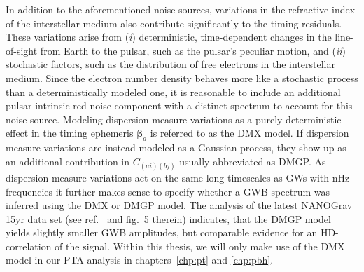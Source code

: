 In addition to the aforementioned noise sources, variations in the refractive index of the interstellar medium also contribute significantly to the timing residuals. These variations arise from (\textit{i}) deterministic, time-dependent changes in the line-of-sight from Earth to the pulsar, such as the pulsar’s peculiar motion, and (\textit{ii}) stochastic factors, such as the distribution of free electrons in the interstellar medium. Since the electron number density behaves more like a stochastic  process than a deterministically modeled one, it is reasonable to include an additional pulsar-intrinsic red noise component with a distinct spectrum to account for this noise source. Modeling dispersion measure variations as a purely deterministic effect in the timing ephemeris $\bm{\beta}_a$ is referred to as the \acs{DMX} model. If dispersion measure variations are instead modeled as a Gaussian process, they show up as an additional contribution in $C_{(ai)(bj)}$ usually abbreviated as \acs{DMGP}. As dispersion measure variations act on the same long timescales as \acp{GW} with nHz frequencies it further makes sense to specify whether a \ac{GWB} spectrum was inferred using the \acs{DMX} or \acs{DMGP} model. The analysis of the latest \ac{NANOGrav} 15yr data set (see ref.~\cite{NANOGrav:2023gor} and fig.~5 therein) indicates, that the \acs{DMGP} model yields slightly smaller \ac{GWB} amplitudes, but comparable evidence for an \ac{HD}-correlation of the signal. Within this thesis, we will only make use of the \acs{DMX} model in our \ac{PTA} analysis in chapters~\ref{chp:pt} and \ref{chp:pbh}.

